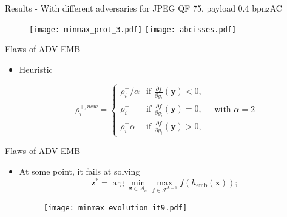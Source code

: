 \documentclass[10pt,aspectratio=169]{beamer}
\newcommand{\femb}{h_{\mathrm{emb}}}
\newcommand{\fset}{\mathcal{F}}
\begin{document}
\begin{frame}{Results - With different adversaries for JPEG QF 75, payload 0.4 bpnzAC}
    \begin{figure}
        \texttt{[image: minmax\_prot\_3.pdf]}
        \texttt{[image: abcisses.pdf]}
    \end{figure}
\end{frame}


\begin{frame}{Flaws of ADV-EMB}

    \begin{itemize}

        \item Heuristic
        
            \begin{equation}
                \rho_{i}^{+, new} = 
                \left\{
                    \begin{array}{ll}
                        \rho_{i}^+/\alpha & \mbox{if } \frac{\partial f}{\partial y_{i}}\left(\mathbf{y}\right) < 0, \\
                        \rho_{i}^+ & \mbox{if } \frac{\partial f}{\partial y_{i}}\left(\mathbf{y}\right) = 0, \\
                        \rho_{i}^+ \alpha & \mbox{if } \frac{\partial f}{\partial y_{i}}\left(\mathbf{y}\right) > 0,
                    \end{array}
                \right.
                \quad \mbox{with } \alpha = 2
            \end{equation}

    \end{itemize}

\end{frame}



\begin{frame}{Flaws of ADV-EMB}

    \begin{itemize}
            
        \item At some point, it fails at solving
            \begin{equation*}
                \mathbf{z}^\ast = \arg \min_{\mathbf{z} \in \mathcal{A}_a} \max_{f \in \fset^{k-1}} f(\femb(\mathbf{x}));
            \end{equation*} 
            
            \begin{figure}
                \texttt{[image: minmax\_evolution\_it9.pdf]}
             \end{figure}
              
    \end{itemize}

\end{frame}
    
\end{document}
